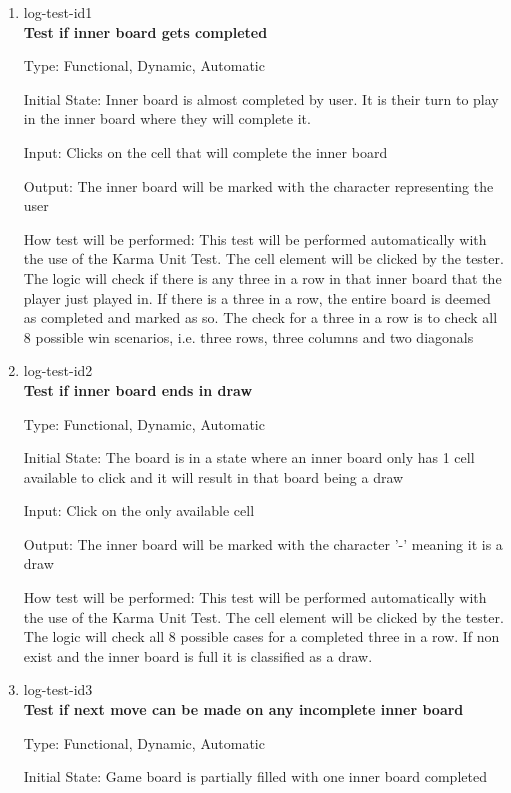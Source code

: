 \documentclass[12pt, titlepage]{article}
\begin{document}
\begin{enumerate}

\item{log-test-id1\\}
\textbf{Test if inner board gets completed}

Type: Functional, Dynamic, Automatic
					
Initial State: Inner board is almost completed by user. It is their turn to play in the inner board where they will complete it. 
					
Input: Clicks on the cell that will complete the inner board
					
Output: The inner board will be marked with the character representing the user
					
How test will be performed: This test will be performed automatically with the use of the Karma Unit Test. The cell element will be clicked by the tester. The logic will check if there is any three in a row in that inner board that the player just played in. If there is a three in a row, the entire board is deemed as completed and marked as so. The check for a three in a row is to check all 8 possible win scenarios, i.e. three rows, three columns and two diagonals

\item{log-test-id2\\}
\textbf{Test if inner board ends in draw}

Type: Functional, Dynamic, Automatic
					
Initial State: The board is in a state where an inner board only has 1 cell available to click and it will result in that board being a draw

Input: Click on the only available cell
					
Output: The inner board will be marked with the character '-' meaning it is a draw
					
How test will be performed: This test will be performed automatically with the use of the Karma Unit Test. The cell element will be clicked by the tester. The logic will check all 8 possible cases for a completed three in a row. If non exist and the inner board is full it is classified as a draw.

\item{log-test-id3\\}
\textbf{Test if next move can be made on any incomplete inner board}

Type: Functional, Dynamic, Automatic
					
Initial State: Game board is partially filled with one inner board completed


\end{enumerate}
\end{document}
